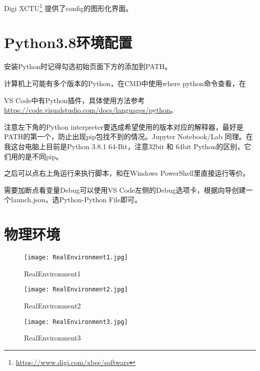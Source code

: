 Digi XCTU\footnote{\url{https://www.digi.com/xbee/software}} 提供了config的图形化界面。

\section{Python3.8环境配置}

安装Python时记得勾选初始页面下方的添加到PATH。

计算机上可能有多个版本的Python，在CMD中使用where python命令查看，在

VS Code中有Python插件，具体使用方法参考\url{https://code.visualstudio.com/docs/languages/python}。

注意左下角的Python interpreter要选成希望使用的版本对应的解释器，最好是PATH的第一个，防止出现pip包找不到的情况。Jupyter Notebook/Lab 同理。在我这台电脑上目前是Python 3.8.1 64-Bit，注意32bit 和 64bit Python的区别，它们用的是不同pip。

之后可以点右上角运行来执行脚本，和在Windows PowerShell里直接运行等价。

需要加断点看变量Debug可以使用VS Code左侧的Debug选项卡，根据向导创建一个launch.json，选Python-Python File即可。

\section{物理环境}

\begin{figure}[htbp]
    \centering
    \texttt{[image: RealEnvironment1.jpg]}
    \caption{RealEnvironment1}
    \label{fig:RealEnvironment1}
\end{figure}

\begin{figure}[htbp]
    \centering
    \texttt{[image: RealEnvironment2.jpg]}
    \caption{RealEnvironment2}
    \label{fig:RealEnvironment2}
\end{figure}

\begin{figure}[htbp]
    \centering
    \texttt{[image: RealEnvironment3.jpg]}
    \caption{RealEnvironment3}
    \label{fig:RealEnvironment3}
\end{figure}

